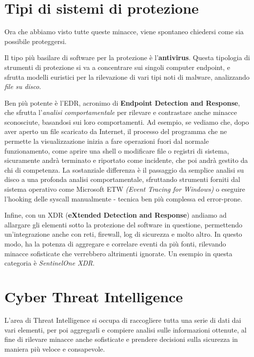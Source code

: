 \section{Tipi di sistemi di protezione}
Ora che abbiamo visto tutte queste minacce, viene spontaneo chiedersi come sia possibile proteggersi.

Il tipo più basilare di software per la protezione è l'\textbf{antivirus}. Questa tipologia di strumenti di protezione si va a concentrare sui singoli computer endpoint, e sfrutta modelli euristici per la rilevazione di vari tipi noti di malware, analizzando \emph{file su disco}.

Ben più potente è l'EDR, acronimo di \textbf{Endpoint Detection and Response}, che sfrutta l'\emph{analisi comportamentale} per rilevare e contrastare anche minacce sconosciute, basandosi sui loro comportamenti. Ad esempio, se vediamo che, dopo aver aperto un file scaricato da Internet, il processo del programma che ne permette la visualizzazione inizia a fare operazioni fuori dal normale funzionamento, come aprire una shell o modificare file o registri di sistema, sicuramente andrà terminato e riportato come incidente, che poi andrà gestito da chi di competenza.
La sostanziale differenza è il passaggio da semplice analisi su disco a una profonda analisi comportamentale, sfruttando strumenti forniti dal sistema operativo come Microsoft ETW \emph{(Event Tracing for Windows)} o eseguire l'hooking delle syscall manualmente - tecnica ben più complessa ed error-prone.

Infine, con un XDR (\textbf{eXtended Detection and Response}) andiamo ad allargare gli elementi sotto la protezione del software in questione, permettendo un'integrazione anche con reti, firewall, log di sicurezza e molto altro.
In questo modo, ha la potenza di aggregare e correlare eventi da più fonti, rilevando minacce sofisticate che verrebbero altrimenti ignorate.
Un esempio in questa categoria è \emph{SentinelOne XDR}.

\section{Cyber Threat Intelligence}
\label{chap:cyber_threat_intelligence}
L'area di Threat Intelligence si occupa di raccogliere tutta una serie di dati dai vari elementi,
per poi aggregarli e compiere analisi sulle informazioni ottenute, al fine di rilevare minacce anche sofisticate e prendere decisioni sulla sicurezza in maniera più veloce e consapevole.

